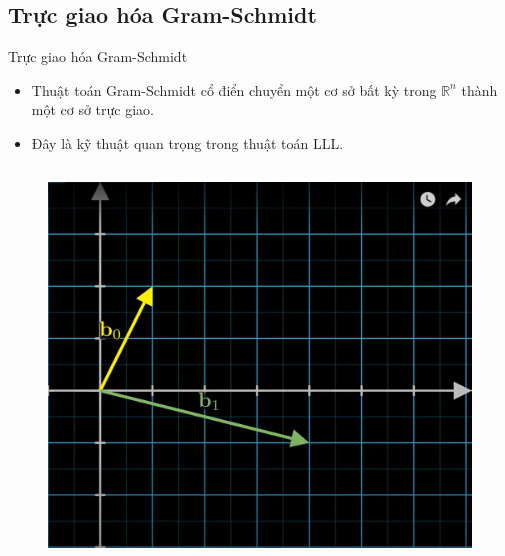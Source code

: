 \documentclass{beamer}
\numberwithin{equation}{section}
\begin{document}
\subsection{Trực giao hóa Gram-Schmidt}
\begin{frame}{Trực giao hóa Gram-Schmidt}
\begin{itemize}
\item Thuật toán Gram-Schmidt cổ điển chuyển một cơ sở bất kỳ trong $\mathbb{R}^n$ thành một cơ sở trực giao.
\item Đây là kỹ thuật quan trọng trong thuật toán LLL.
\end{itemize}

\begin{columns}

\begin{column}{0.5\textwidth}
\begin{figure}[h]
\centering
\includegraphics[width=\textwidth]{pictures/GramSchmidtYouTube0.png}
\end{figure}
\end{column}


\end{columns}
\end{frame}
\end{document}
